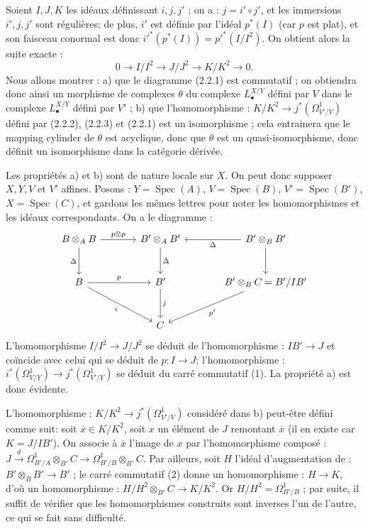 \documentclass[11pt]{article}
\DeclareMathOperator{\Spec}{Spec}
\begin{document}
Soient $I,J,K$ les idéaux définissant $i,j,j'$ ; on a : $j=i'\circ j'$, et les immersions $i',j,j'$ sont régulières; de plus, $i'$ est définie par l'idéal $p^*(I)$ (car $p$ est plat), et son faisceau conormal est donc $i'^*(p^*(I))=p'^*(I/I^2)$. On obtient alors la suite exacte :
\begin{equation}\tag{2.2.3}
0\longrightarrow I/I^2\longrightarrow J/J^2\longrightarrow K/K^2\longrightarrow0.
\end{equation}
Nous allons montrer : a) que le diagramme (2.2.1) est commutatif ; on obtiendra donc ainsi un morphisme de complexes $\theta$ du complexe $L^{X/Y}_\bullet$ défini par $V$ dans le complexe $L^{X/Y}_\bullet$ défini par $V'$ ; b) que l'homomorphisme : $K/K^2\longrightarrow j^*(\Omega^1_{V'/V})$ défini par (2.2.2), (2.2.3) et (2.2.1) est un isomorphisme ; cela entrainera que le mapping cylinder de $\theta$ est acyclique, donc que $\theta$ est un quasi-isomorphisme, donc définit un isomorphisme dans la catégorie dérivée.

Les propriétés a) et b) sont de nature locale sur $X$. On peut donc supposer $X,Y,V$ et $V'$ affines. Posons : $Y=\Spec(A)$, $V=\Spec(B)$, $V'=\Spec(B')$, $X=\Spec(C)$, et gardons les mêmes lettres pour noter les homomorphismes et les idéaux correspondants. On a le diagramme :
\[
\begin{tikzcd}[column sep=large,row sep=large]
B\otimes_A B \arrow[r,"p\otimes p"] \arrow[d,"\Delta"'] & B'\otimes_A B' \arrow[d,"\Delta"] & B'\otimes_B B' \arrow[l,"\Delta"] \arrow[d]\\
B \arrow[r,"p"] \arrow[dr,"i"'] & B' \arrow[d,"j"] & B'\otimes_B C = B'/IB' \arrow[dl,"p'" ]\\
{} & C & {}
\end{tikzcd}
\]
L'homomorphisme $I/I^2\to J/J^2$ se déduit de l'homomorphisme : $IB'\to J$ et coïncide avec celui qui se déduit de $p:I\to J$; l'homomorphisme : $i^*(\Omega^1_{V/Y})\longrightarrow j^*(\Omega^1_{V'/Y})$ se déduit du carré commutatif (1). La propriété a) est donc évidente.

L'homomorphisme : $K/K^2\to j^*(\Omega^1_{V'/V})$ considéré dans b) peut-être défini comme suit: soit $\overline x\in K/K^2$, soit $x$ un élément de $J$ remontant $\overline x$ (il en existe car $K=J/IB'$). On associe à $\overline x$ l'image de $x$ par l'homomorphisme composé : $J\xrightarrow{d}\Omega^1_{B'/A}\otimes_{B'}C\longrightarrow\Omega^1_{B'/B}\otimes_{B'}C$. Par ailleurs, soit $H$ l'idéal d'augmentation de : $B'\otimes_B B'\longrightarrow B'$ ; le carré commutatif (2) donne un homomorphisme : $H\to K$, d'où un homomorphisme : $H/H^2\otimes_{B'}C\longrightarrow K/K^2$. Or $H/H^2=\Omega^1_{B'/B}$ ; par suite, il suffit de vérifier que les homomorphismes construits sont inverses l'un de l'autre, ce qui se fait sans difficulté.
\end{document}
